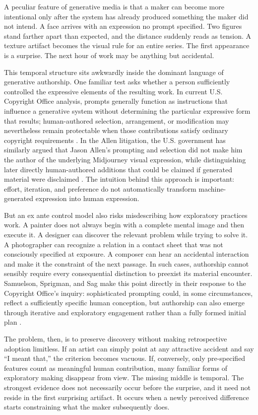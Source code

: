 \documentclass[11pt]{article}
\begin{document}
A peculiar feature of generative media is that a maker can become more intentional only after the system has already produced something the maker did not intend. A face arrives with an expression no prompt specified. Two figures stand farther apart than expected, and the distance suddenly reads as tension. A texture artifact becomes the visual rule for an entire series. The first appearance is a surprise. The next hour of work may be anything but accidental.

This temporal structure sits awkwardly inside the dominant language of generative authorship. One familiar test asks whether a person sufficiently controlled the expressive elements of the resulting work. In current U.S. Copyright Office analysis, prompts generally function as instructions that influence a generative system without determining the particular expressive form that results; human-authored selection, arrangement, or modification may nevertheless remain protectable when those contributions satisfy ordinary copyright requirements \citep{USCO2025Copyrightability}. In the Allen litigation, the U.S. government has similarly argued that Jason Allen's prompting and selection did not make him the author of the underlying Midjourney visual expression, while distinguishing later directly human-authored additions that could be claimed if generated material were disclaimed \citep{AllenGov2026Brief}. The intuition behind this approach is important: effort, iteration, and preference do not automatically transform machine-generated expression into human expression.

But an ex ante control model also risks misdescribing how exploratory practices work. A painter does not always begin with a complete mental image and then execute it. A designer can discover the relevant problem while trying to solve it. A photographer can recognize a relation in a contact sheet that was not consciously specified at exposure. A composer can hear an accidental interaction and make it the constraint of the next passage. In such cases, authorship cannot sensibly require every consequential distinction to preexist its material encounter. Samuelson, Sprigman, and Sag make this point directly in their response to the Copyright Office's inquiry: sophisticated prompting could, in some circumstances, reflect a sufficiently specific human conception, but authorship can also emerge through iterative and exploratory engagement rather than a fully formed initial plan \citep{SamuelsonSprigmanSag2023Comments}.

The problem, then, is to preserve discovery without making retrospective adoption limitless. If an artist can simply point at any attractive accident and say ``I meant that,'' the criterion becomes vacuous. If, conversely, only pre-specified features count as meaningful human contribution, many familiar forms of exploratory making disappear from view. The missing middle is temporal. The strongest evidence does not necessarily occur before the surprise, and it need not reside in the first surprising artifact. It occurs when a newly perceived difference starts constraining what the maker subsequently does.
\end{document}
